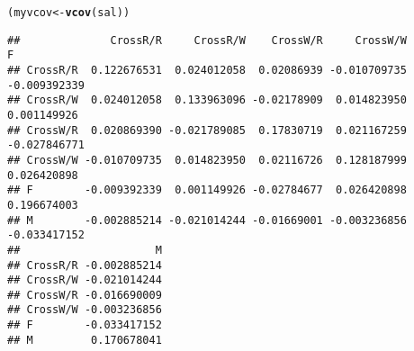 \documentclass[11pt]{article}\usepackage[]{graphicx}\usepackage[]{color}
\makeatletter
\newcommand{\hlstd}[1]{\textcolor[rgb]{0.345,0.345,0.345}{#1}}%
\newcommand{\hlkwb}[1]{\textcolor[rgb]{0.69,0.353,0.396}{#1}}%
\newcommand{\hlkwd}[1]{\textcolor[rgb]{0.737,0.353,0.396}{\textbf{#1}}}%
\newenvironment{kframe}{%
 \def\at@end@of@kframe{}%
 \ifinner\ifhmode%
  \def\at@end@of@kframe{\end{minipage}}%
  \begin{minipage}{\columnwidth}%
 \fi\fi%
 \def\FrameCommand##1{\hskip\@totalleftmargin \hskip-\fboxsep
 \colorbox{shadecolor}{##1}\hskip-\fboxsep
     \hskip-\linewidth \hskip-\@totalleftmargin \hskip\columnwidth}%
 \MakeFramed {\advance\hsize-\width
   \@totalleftmargin\z@ \linewidth\hsize
   \@setminipage}}%
 {\par\unskip\endMakeFramed%
 \at@end@of@kframe}
\newenvironment{knitrout}{}{} %
\makeatother
\begin{document}
\begin{knitrout}
\color{fgcolor}\begin{kframe}
\begin{alltt}
\hlstd{(myvcov} \hlkwb{<-} \hlkwd{vcov}\hlstd{(sal))}
\end{alltt}
\begin{verbatim}
##              CrossR/R     CrossR/W    CrossW/R     CrossW/W            F
## CrossR/R  0.122676531  0.024012058  0.02086939 -0.010709735 -0.009392339
## CrossR/W  0.024012058  0.133963096 -0.02178909  0.014823950  0.001149926
## CrossW/R  0.020869390 -0.021789085  0.17830719  0.021167259 -0.027846771
## CrossW/W -0.010709735  0.014823950  0.02116726  0.128187999  0.026420898
## F        -0.009392339  0.001149926 -0.02784677  0.026420898  0.196674003
## M        -0.002885214 -0.021014244 -0.01669001 -0.003236856 -0.033417152
##                     M
## CrossR/R -0.002885214
## CrossR/W -0.021014244
## CrossW/R -0.016690009
## CrossW/W -0.003236856
## F        -0.033417152
## M         0.170678041
\end{verbatim}
\end{kframe}
\end{knitrout}
\end{document}
